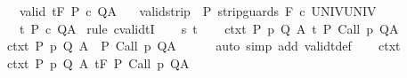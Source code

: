 \begin{isabellebody}
\ \ \ valid{\isacharcolon}\ {\isachardoublequoteopen}{\isasymGamma}{\isacharcomma}{\isasymTheta}{\isasymTurnstile}\isactrlsub t\isactrlbsub {\isacharslash}F\isactrlesub \ P\ c\ Q{\isacharcomma}A{\isachardoublequoteclose}\isanewline
\ \ \ valid{\isacharunderscore}strip{\isacharcolon}\ {\isachardoublequoteopen}{\isasymGamma}{\isacharcomma}{\isasymTheta}{\isasymTurnstile}\isactrlbsub {\isacharslash}{\isacharbraceleft}{\isacharbraceright}\isactrlesub \ P\ {\isacharparenleft}strip{\isacharunderscore}guards\ {\isacharparenleft}{\isacharminus}F{\isacharparenright}\ c{\isacharparenright}\ UNIV{\isacharcomma}UNIV{\isachardoublequoteclose}\isanewline
\ \ \ {\isachardoublequoteopen}{\isasymGamma}{\isacharcomma}{\isasymTheta}{\isasymTurnstile}\isactrlsub t\isactrlbsub {\isacharslash}{\isacharbraceleft}{\isacharbraceright}\isactrlesub \ P\ c\ Q{\isacharcomma}A{\isachardoublequoteclose}\isanewline
%
\isadelimproof
%
\endisadelimproof
%
\isatagproof
{}\isamarkupfalse%
\ {\isacharparenleft}rule\ cvalidtI{\isacharparenright}\isanewline
\ \ \isamarkupfalse%
\ s\ t\isanewline
\ \ \isamarkupfalse%
\ ctxt{\isacharcolon}\ {\isachardoublequoteopen}{\isasymforall}{\isacharparenleft}P{\isacharcomma}\ p{\isacharcomma}\ Q{\isacharcomma}\ A{\isacharparenright}{\isasymin}{\isasymTheta}{\isachardot}\ {\isasymGamma}{\isasymTurnstile}\isactrlsub t\isactrlbsub {\isacharslash}{\isacharbraceleft}{\isacharbraceright}\isactrlesub \ P\ {\isacharparenleft}Call\ p{\isacharparenright}\ Q{\isacharcomma}A{\isachardoublequoteclose}\isanewline
\ \ \isamarkupfalse%
\ ctxt{\isacharprime}{\isacharcolon}\ {\isachardoublequoteopen}{\isasymforall}{\isacharparenleft}P{\isacharcomma}\ p{\isacharcomma}\ Q{\isacharcomma}\ A{\isacharparenright}{\isasymin}{\isasymTheta}{\isachardot}\ {\isasymGamma}{\isasymTurnstile}\isactrlbsub {\isacharslash}{\isacharbraceleft}{\isacharbraceright}\isactrlesub \ P\ {\isacharparenleft}Call\ p{\isacharparenright}\ Q{\isacharcomma}A{\isachardoublequoteclose}\isanewline
\ \ \ \ \isamarkupfalse%
\ {\isacharparenleft}auto\ simp\ add{\isacharcolon}\ validt{\isacharunderscore}def{\isacharparenright}\isanewline
\ \ \isamarkupfalse%
\ ctxt\ \isamarkupfalse%
\ ctxt{\isacharprime}{\isacharprime}{\isacharcolon}\ {\isachardoublequoteopen}{\isasymforall}{\isacharparenleft}P{\isacharcomma}\ p{\isacharcomma}\ Q{\isacharcomma}\ A{\isacharparenright}{\isasymin}{\isasymTheta}{\isachardot}\ {\isasymGamma}{\isasymTurnstile}\isactrlsub t\isactrlbsub {\isacharslash}F\isactrlesub \ P\ {\isacharparenleft}Call\ p{\isacharparenright}\ Q{\isacharcomma}A{\isachardoublequoteclose}\ \isanewline

\end{isabellebody}
